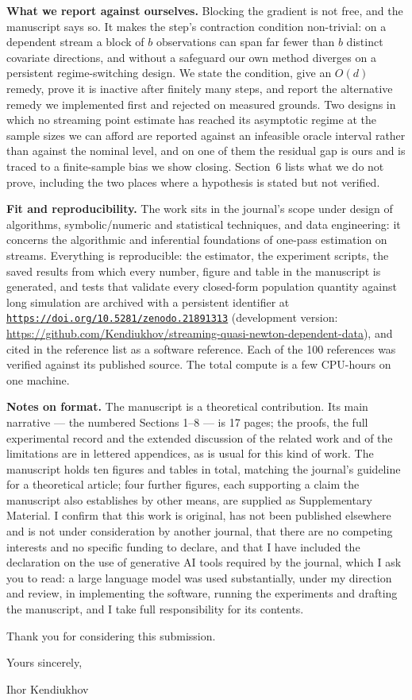 \documentclass[11pt]{article}
\begin{document}
\textbf{What we report against ourselves.} Blocking the gradient is not free, and the manuscript
says so. It makes the step's contraction condition non-trivial: on a dependent stream a block of
$b$ observations can span far fewer than $b$ distinct covariate directions, and without a
safeguard our own method diverges on a persistent regime-switching design. We state the condition,
give an $O(d)$ remedy, prove it is inactive after finitely many steps, and report the alternative
remedy we implemented first and rejected on measured grounds. Two designs in which no streaming
point estimate has reached its asymptotic regime at the sample sizes we can afford are reported
against an infeasible oracle interval rather than against the nominal level, and on one of them
the residual gap is ours and is traced to a finite-sample bias we show closing. Section~6 lists
what we do not prove, including the two places where a hypothesis is stated but not verified.

\textbf{Fit and reproducibility.} The work sits in the journal's scope under design of algorithms,
symbolic/numeric and statistical techniques, and data engineering: it concerns the algorithmic and
inferential foundations of one-pass estimation on streams. Everything is reproducible: the
estimator, the experiment scripts, the saved results from which every number, figure and table in
the manuscript is generated, and tests that validate every closed-form population quantity against
long simulation are archived with a persistent identifier at
\href{https://doi.org/10.5281/zenodo.21891313}{\texttt{https://doi.org/10.5281/zenodo.21891313}}
(development version:
\url{https://github.com/Kendiukhov/streaming-quasi-newton-dependent-data}), and cited in the
reference list as a software reference. Each of the 100 references was verified against its
published source. The total compute is a few CPU-hours on one machine.

\textbf{Notes on format.} The manuscript is a theoretical contribution. Its main narrative --- the
numbered Sections 1--8 --- is 17 pages; the proofs, the full experimental record and the extended
discussion of the related work and of the limitations are in lettered appendices, as is usual for
this kind of work. The manuscript holds ten figures and tables in total, matching the journal's
guideline for a theoretical article; four further figures, each supporting a claim the
manuscript also establishes by other means, are supplied as Supplementary Material. I confirm that this work is
original, has not been published elsewhere and is not under consideration by another journal, that
there are no competing interests and no specific funding to declare, and that I have included the
declaration on the use of generative AI tools required by the journal, which I ask you to read: a
large language model was used substantially, under my direction and review, in implementing the
software, running the experiments and drafting the manuscript, and I take full responsibility for
its contents.

Thank you for considering this submission.

\bigskip
\noindent
Yours sincerely,

\bigskip
\noindent
Ihor Kendiukhov
\end{document}
